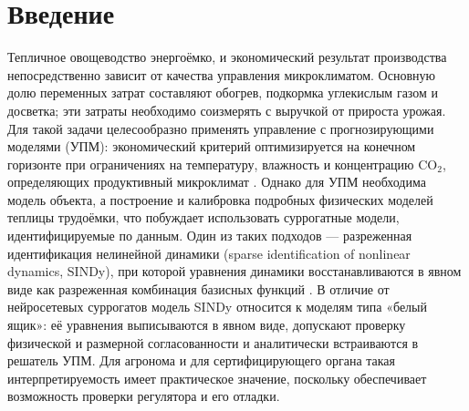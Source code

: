 \documentclass[12pt,a4paper,leqno]{article}
\begin{document}
\vspace{4mm}

\section{Введение}
\label{sec:intro}

Тепличное овощеводство энергоёмко, и экономический результат производства
непосредственно зависит от качества управления микроклиматом. Основную долю переменных
затрат составляют обогрев, подкормка углекислым газом и досветка; эти затраты необходимо
соизмерять с выручкой от прироста урожая. Для такой задачи целесообразно применять
управление с прогнозирующими моделями (УПМ): экономический критерий оптимизируется на
конечном горизонте при ограничениях на температуру, влажность и концентрацию CO$_2$,
определяющих продуктивный микроклимат \cite{veremey2016,mayne2000,lin2021}. Однако
для УПМ необходима модель объекта, а построение и калибровка подробных физических
моделей теплицы трудоёмки, что побуждает использовать суррогатные модели,
идентифицируемые по данным. Один из таких подходов — разреженная идентификация
нелинейной динамики (sparse identification of nonlinear dynamics, SINDy), при которой
уравнения динамики восстанавливаются в явном виде как разреженная комбинация базисных
функций \cite{brunton2016,brunton2016c,kaiser2018}. В отличие от нейросетевых
суррогатов модель SINDy относится к моделям типа «белый ящик»: её уравнения
выписываются в явном виде, допускают проверку физической и размерной согласованности и
аналитически встраиваются в решатель УПМ. Для агронома и для сертифицирующего органа
такая интерпретируемость имеет практическое значение, поскольку обеспечивает возможность
проверки регулятора и его отладки.
\end{document}

